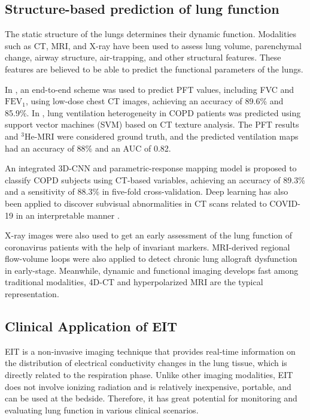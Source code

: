 \documentclass[journal,twoside,web]{ieeecolor}
\begin{document}
\subsection{Structure-based prediction of lung function}
The static structure of the lungs determines their dynamic function. Modalities such as CT, MRI, and X-ray have been used to assess lung volume, parenchymal change, airway structure, air-trapping, and other structural features. These features are believed to be able to predict the functional parameters of the lungs.

In \cite{park2023deep}, an end-to-end scheme was used to predict PFT values, including FVC and $\text{FEV}_{1}$, using low-dose chest CT images, achieving an accuracy of 89.6\% and 85.9\%. In \cite{westcott2019chronic}, lung ventilation heterogeneity in COPD patients was predicted using support vector machines (SVM) based on CT texture analysis. The PFT results and $^{3}$He-MRI were considered ground truth, and the predicted ventilation maps had an accuracy of 88\% and an AUC of 0.82.

An integrated 3D-CNN and parametric-response mapping model\cite{ho20213d} is proposed to classify COPD subjects using CT-based variables, achieving an accuracy of 89.3\% and a sensitivity of 88.3\% in five-fold cross-validation. 
Deep learning has also been applied to discover subvisual abnormalities in CT scans related to COVID-19 in an interpretable manner \cite{zhou2022interpretable}.

X-ray images were also used to get an early assessment of the lung function of coronavirus patients with the help of invariant markers\cite{elsharkawy2021early}. MRI-derived regional flow-volume loops were also applied to detect chronic lung allograft dysfunction in early-stage\cite{moher2019mri}. Meanwhile, dynamic and functional imaging develops fast among traditional modalities, 4D-CT \cite{yamamoto2014pulmonary,yamamoto2023four} and hyperpolarized MRI \cite{doganay2019time,voskrebenzev2018feasibility} are the typical representation. 


\subsection{Clinical Application of EIT}

EIT is a non-invasive imaging technique that provides real-time information on the distribution of electrical conductivity changes in the lung tissue, which is directly related to the respiration phase. Unlike other imaging modalities, EIT does not involve ionizing radiation and is relatively inexpensive, portable, and can be used at the bedside. Therefore, it has great potential for monitoring and evaluating lung function in various clinical scenarios\cite{adler2012whither}. 
\end{document}
